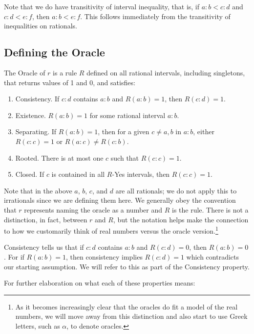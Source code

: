 \documentclass[12pt]{article}
\begin{document}
Note that we do have transitivity of interval inequality, that is, if $a:b < c:d$ and $c:d < e:f$, then $a:b < e:f$. This follows immediately from the transitivity of inequalities on rationals.


\subsection{Defining the Oracle}

The Oracle of $r$ is a rule $R$ defined on all rational intervals, including singletons, that returns values of 1 and 0, and satisfies: 
\begin{enumerate}
    \item Consistency. If $c:d$ contains $a:b$ and $R(a:b) = 1$, then $R(c:d) = 1$.
    \item Existence. $R(a:b) = 1$ for some rational interval $a:b$.
    \item Separating. If $R(a:b)=1$, then for a given $c \neq a, b$ in $a:b$, either $R(c:c) = 1$ or $R(a:c) \neq R(c:b)$. 
    \item Rooted. There is at most one $c$ such that $R(c:c) =1$.
    \item Closed. If $c$ is contained in all $R$-Yes intervals, then $R(c:c) = 1$.
\end{enumerate}

Note that in the above $a$, $b$, $c$, and $d$ are all rationals; we do not apply this to irrationals since we are defining them here. We generally obey the convention that $r$ represents naming the oracle as a number and $R$ is the rule. There is not a distinction, in fact, between $r$ and $R$, but the notation helps make the connection to how we customarily think of real numbers versus the oracle version.\footnote{As it becomes increasingly clear that the oracles do fit a model of the real numbers, we will move away from this distinction and also start to use Greek letters, such as $\alpha$, to denote oracles.}

Consistency tells us that if $c:d$ contains $a:b$ and $R(c:d) = 0$, then $R(a:b) = 0$. For if $R(a:b)=1$, then consistency implies $R(c:d)=1$ which contradicts our starting assumption. We will refer to this as part of the Consistency property. 

For further elaboration on what each of these properties means:
\end{document}
